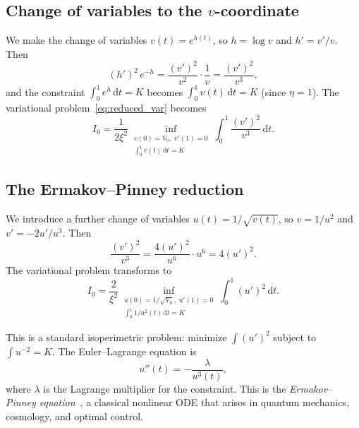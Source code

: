 \documentclass[11pt]{article}
\theoremstyle{definition}
\newcommand{\dd}{\mathrm{d}}
\begin{document}
\subsection{Change of variables to the $v$-coordinate}\label{sec:v_coord}

We make the change of variables $v(t) = e^{h(t)}$, so $h = \log v$ and $h' = v'/v$. Then
\begin{equation}
  (h')^2\,e^{-h} = \frac{(v')^2}{v^2} \cdot \frac{1}{v} = \frac{(v')^2}{v^3},
\end{equation}
and the constraint $\int_0^1 e^h\,\dd t = K$ becomes $\int_0^1 v(t)\,\dd t = K$ (since $\eta = 1$). The variational problem~\eqref{eq:reduced_var} becomes
\begin{equation}\label{eq:v_problem}
  I_0 = \frac{1}{2\xi^2}\inf_{\substack{v(0) = V_0,\; v'(1) = 0 \\ \int_0^1 v(t)\,\dd t = K}} \int_0^1 \frac{(v')^2}{v^3}\,\dd t.
\end{equation}

\subsection{The Ermakov--Pinney reduction}\label{sec:ermakov}

We introduce a further change of variables $u(t) = 1/\sqrt{v(t)}$, so $v = 1/u^2$ and $v' = -2u'/u^3$. Then
\begin{equation}
  \frac{(v')^2}{v^3} = \frac{4(u')^2}{u^6} \cdot u^6 = 4(u')^2.
\end{equation}
The variational problem transforms to
\begin{equation}\label{eq:u_problem}
  I_0 = \frac{2}{\xi^2}\inf_{\substack{u(0) = 1/\sqrt{V_0},\; u'(1) = 0 \\ \int_0^1 1/u^2(t)\,\dd t = K}} \int_0^1 (u')^2\,\dd t.
\end{equation}

This is a standard isoperimetric problem: minimize $\int (u')^2$ subject to $\int u^{-2} = K$. The Euler--Lagrange equation is
\begin{equation}\label{eq:ermakov_pinney}
  u''(t) = -\frac{\lambda}{u^3(t)},
\end{equation}
where $\lambda$ is the Lagrange multiplier for the constraint. This is the \emph{Ermakov--Pinney equation}~\cite{Ermakov1880,Pinney1950}, a classical nonlinear ODE that arises in quantum mechanics, cosmology, and optimal control.
\end{document}
